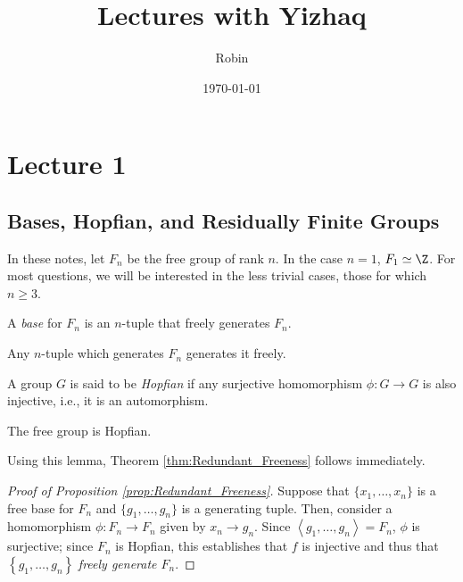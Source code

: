 \documentclass[12pt]{article}
\title{Lectures with Yizhaq}
\author{Robin}
\date{\today}
\begin{document}
\maketitle
\tableofcontents
\thispagestyle{empty}
\newpage

\section{Lecture 1}
\subsection{Bases, Hopfian, and Residually Finite Groups}

In these notes, let $F_n$ be the free group of rank $n$. In the case $n = 1$, $F_1 \simeq \Z$. For most questions, we will be interested in the less trivial cases, those for which $n \geq 3$. 

\begin{definition}\label{def:Base_for_Free_Group}
    A \emph{base} for $F_n$ is an $n$-tuple that freely generates $F_n$.
\end{definition}

\begin{theorem}\label{thm:Redundant_Freeness}
    Any $n$-tuple which generates $F_n$ generates it freely.
\end{theorem}

\begin{definition}[Hopfian]\label{def:Hopfian}
    A group $G$ is said to be \emph{Hopfian} if any surjective homomorphism $\phi: G \rightarrow G$ is also injective, i.e., it is an automorphism. 
\end{definition}

\begin{lemma}\label{lem:The_Free_Group_is_Hopfian}
    The free group is Hopfian.
\end{lemma}

Using this lemma, Theorem \ref{thm:Redundant_Freeness} follows immediately. 

\begin{proof}[Proof of Proposition \ref{prop:Redundant_Freeness}]
    Suppose that $\{x_1, \ldots, x_n\}$ is a free base for $F_n$ and $\{g_1, \ldots, g_n\}$ is a generating tuple. Then, consider a homomorphism $\phi: F_n \rightarrow F_n$ given by $x_n \rightarrow g_n$. Since $\left<g_1, \ldots, g_n\right> = F_n$, $\phi$ is surjective; since $F_n$ is Hopfian, this establishes that $f$ is injective and thus that $\left\{g_1, \ldots, g_n\right\}$ \emph{freely generate $F_n$}.
\end{proof}
\end{document}
